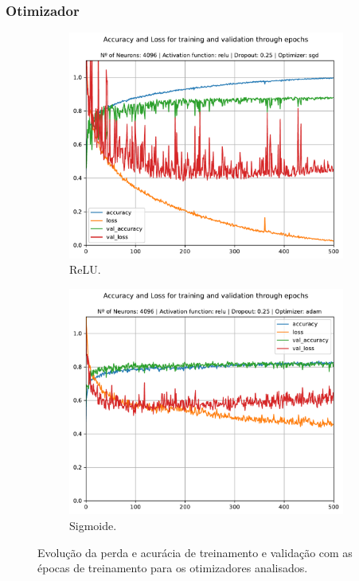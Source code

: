 \subsubsection{Otimizador}

\begin{figure}[H]
	\centering
	\begin{subfigure}[H]{0.49\textwidth}
		\includegraphics[width = \textwidth]{../../plot/mlp/mlp_4096_relu_0.25_sgd}
		\caption{ReLU.}
		\label{fig:mlp_4096_relu_0.0_sgd_opt}
	\end{subfigure}
	\begin{subfigure}[H]{0.49\textwidth}
		\centering
		\includegraphics[width = \textwidth]{../../plot/mlp/mlp_4096_relu_0.25_adam}
		\caption{Sigmoide.}
		\label{fig:mlp_4096_relu_0.25_adam}
	\end{subfigure}
	\caption{Evolução da perda e acurácia de treinamento e validação com as épocas de treinamento para os otimizadores analisados.}
\end{figure}

